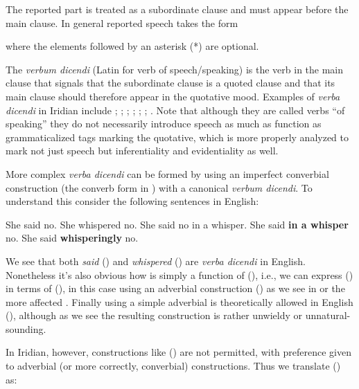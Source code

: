 The reported part is treated as a subordinate clause and must appear before the main clause. In general reported speech takes the form

\ex{}\xe


where the elements followed by an asterisk (*) are optional.

The \emph{verbum dicendi} (Latin for verb of speech/speaking) is the verb in the main clause that signals that the subordinate clause is a quoted clause and that its main clause should therefore appear in the quotative mood. Examples of \emph{verba dicendi} in Iridian include ; ; ; ; ; ; . Note that although they are called verbs ``of speaking'' they do not necessarily introduce speech as much as function as grammaticalized tags marking the quotative,  which is more properly analyzed to mark not just speech but inferentiality and evidentiality as well.

More complex \emph{verba dicendi} can be formed by using an imperfect converbial construction (the converb form in ) with a canonical \emph{verbum dicendi}. To understand this consider the following sentences in English:

\pex[*=?*]
\a She said no.
\a She whispered no.
\a She said no in a whisper.
\a {} She said \textbf{in a whisper} no.
\a {} She said \textbf{whisperingly} no.
\xe

\smallskip

We see that both \emph{said} () and \emph{whispered} () are \emph{verba dicendi} in English. Nonetheless it's also obvious how  is simply a function of (), i.e., we can express () in terms of (), in this case using an adverbial construction () as we see in  or the more affected . Finally using a simple adverbial is theoretically allowed in English (), although as we see the resulting construction is rather unwieldy or unnatural-sounding.

In Iridian, however, constructions like () are not permitted, with preference given to adverbial (or more correctly, converbial) constructions. Thus we translate () as:

